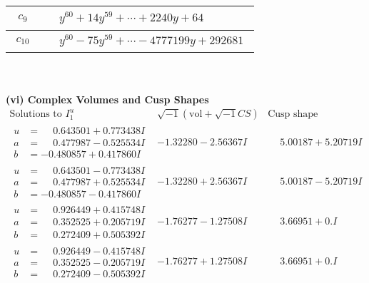\documentclass[1p]{elsarticle_modified}
\theoremstyle{definition}
\newcommand{\I}{\sqrt{-1}}
\begin{document}
\begin{tabular}{m{50pt}|m{274pt}}
\hline $$\begin{aligned}c_{9}\end{aligned}$$&$\begin{aligned}
&y^{60}+14 y^{59}+\cdots+2240 y+64
\end{aligned}$\\
\hline $$\begin{aligned}c_{10}\end{aligned}$$&$\begin{aligned}
&y^{60}-75 y^{59}+\cdots-4777199 y+292681
\end{aligned}$\\
\hline
\end{tabular}\\~\\
\newpage\flushleft \textbf{(vi) Complex Volumes and Cusp Shapes}
$$\begin{array}{c|c|c}  
\text{Solutions to }I^u_{1}& \I (\text{vol} + \sqrt{-1}CS) & \text{Cusp shape}\\
 \hline 
\begin{aligned}
u &= \phantom{-}0.643501 + 0.773438 I \\
a &= \phantom{-}0.477987 - 0.525534 I \\
b &= -0.480857 + 0.417860 I\end{aligned}
 & -1.32280 - 2.56367 I & \phantom{-}5.00187 + 5.20719 I \\ \hline\begin{aligned}
u &= \phantom{-}0.643501 - 0.773438 I \\
a &= \phantom{-}0.477987 + 0.525534 I \\
b &= -0.480857 - 0.417860 I\end{aligned}
 & -1.32280 + 2.56367 I & \phantom{-}5.00187 - 5.20719 I \\ \hline\begin{aligned}
u &= \phantom{-}0.926449 + 0.415748 I \\
a &= \phantom{-}0.352525 + 0.205719 I \\
b &= \phantom{-}0.272409 + 0.505392 I\end{aligned}
 & -1.76277 - 1.27508 I & \phantom{-}3.66951 + 0. I\phantom{ +0.000000I} \\ \hline\begin{aligned}
u &= \phantom{-}0.926449 - 0.415748 I \\
a &= \phantom{-}0.352525 - 0.205719 I \\
b &= \phantom{-}0.272409 - 0.505392 I\end{aligned}
 & -1.76277 + 1.27508 I & \phantom{-}3.66951 + 0. I\phantom{ +0.000000I} \\ \hline\begin{aligned}

\end{aligned}
\end{array}$$
\end{document}
